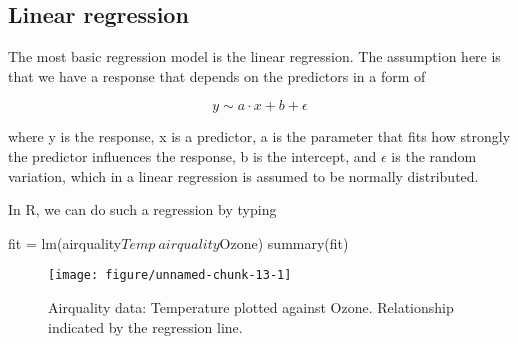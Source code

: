 \documentclass[a4paper,twoside]{tufte-book}\usepackage[]{graphicx}\usepackage[]{color}
\makeatletter
\def\maxwidth{ %
  \ifdim\Gin@nat@width>\linewidth
    \linewidth
  \else
    \Gin@nat@width
  \fi
}
\makeatother
\begin{document}
{\subsection{Linear regression}

The most basic regression model is the linear regression. The assumption here is that we have a response that depends on the predictors in a form of 

\begin{equation} \label{eq: linear regression}
y \sim a \cdot x + b + \epsilon 
\end{equation}

where y is the response, x is a predictor, a is the parameter that fits how strongly the predictor influences the response, b is the intercept, and $\epsilon$ is the random variation, which in a linear regression is assumed to be normally distributed. 

In R, we can do such a regression by typing

\begin{Schunk}
\begin{Sinput}
fit = lm(airquality$Temp~airquality$Ozone)
summary(fit)
\end{Sinput}
\end{Schunk}

\begin{figure}[htbp]
\begin{center}
\begin{Schunk}

\texttt{[image: figure/unnamed-chunk-13-1]} \end{Schunk}
\caption{Airquality data: Temperature plotted against Ozone. Relationship indicated by the regression line.}
\label{fig: LR}
\end{center}
\end{figure}

}
\end{document}
